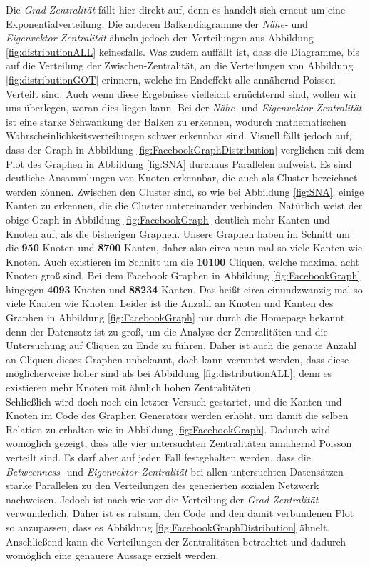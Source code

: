 Die \textit{Grad-Zentralität} fällt hier direkt auf, denn es handelt sich erneut um eine Exponentialverteilung. Die anderen Balkendiagramme der \textit{Nähe-} und \textit{Eigenvektor-Zentralität} ähneln jedoch den Verteilungen aus Abbildung \ref{fig:distributionALL} keinesfalls. Was zudem auffällt ist, dass die Diagramme, bis auf die Verteilung der Zwischen-Zentralität, an die Verteilungen von Abbildung \ref{fig:distributionGOT} erinnern, welche im Endeffekt alle annähernd Poisson-Verteilt sind. Auch wenn diese Ergebnisse vielleicht ernüchternd sind, wollen wir uns überlegen, woran dies liegen kann. Bei der \textit{Nähe-} und \textit{Eigenvektor-Zentralität} ist eine starke Schwankung der Balken zu erkennen, wodurch mathematischen Wahrscheinlichkeitsverteilungen schwer erkennbar sind. Visuell fällt jedoch auf, dass der Graph in Abbildung \ref{fig:FacebookGraphDistribution} verglichen mit dem Plot des Graphen in Abbildung \ref{fig:SNA} durchaus Parallelen aufweist. Es sind deutliche Ansammlungen von Knoten erkennbar, die auch als Cluster bezeichnet werden können. Zwischen den Cluster sind, so wie bei Abbildung \ref{fig:SNA}, einige Kanten zu erkennen, die die Cluster untereinander verbinden. Natürlich weist der obige Graph in Abbildung \ref{fig:FacebookGraph} deutlich mehr Kanten und Knoten auf, als die bisherigen Graphen. Unsere Graphen haben im Schnitt um die \textbf{950} Knoten und \textbf{8700} Kanten, daher also circa neun mal so viele Kanten wie Knoten. Auch existieren im Schnitt um die \textbf{10100} Cliquen, welche maximal acht Knoten groß sind. Bei dem Facebook Graphen in Abbildung \ref{fig:FacebookGraph} hingegen \textbf{4093} Knoten und \textbf{88234} Kanten. Das heißt circa einundzwanzig mal so viele Kanten wie Knoten. Leider ist die Anzahl an Knoten und Kanten des Graphen in Abbildung \ref{fig:FacebookGraph} nur durch die Homepage \cite{FBData} bekannt, denn der Datensatz ist zu groß, um die Analyse der Zentralitäten und die Untersuchung auf Cliquen zu Ende zu führen. Daher ist auch die genaue Anzahl an Cliquen dieses Graphen unbekannt, doch kann vermutet werden, dass diese möglicherweise höher sind als bei Abbildung \ref{fig:distributionALL}, denn es existieren mehr Knoten mit ähnlich hohen Zentralitäten. \\

\newpage
Schließlich wird doch noch ein letzter Versuch gestartet, und die Kanten und Knoten im Code des Graphen Generators werden erhöht, um damit die selben Relation zu erhalten wie in Abbildung \ref{fig:FacebookGraph}. Dadurch wird womöglich gezeigt, dass alle vier untersuchten Zentralitäten annähernd Poisson verteilt sind. Es darf aber auf jeden Fall festgehalten werden, dass die \textit{Betweenness-} und \textit{Eigenvektor-Zentralität} bei allen untersuchten Datensätzen starke Parallelen zu den Verteilungen des generierten sozialen Netzwerk nachweisen. Jedoch ist nach wie vor die Verteilung der \textit{Grad-Zentralität} verwunderlich. Daher ist es ratsam, den Code und den damit verbundenen Plot so anzupassen, dass es Abbildung \ref{fig:FacebookGraphDistribution} ähnelt. Anschließend kann die Verteilungen der Zentralitäten betrachtet und dadurch womöglich eine genauere Aussage erzielt werden. 



